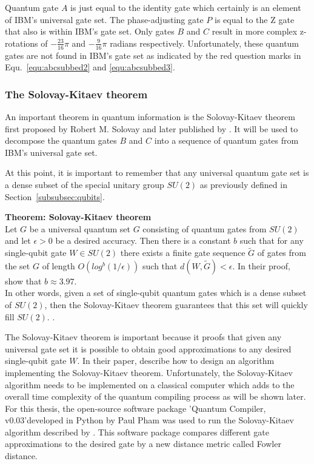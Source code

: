 Quantum gate $A$ is just equal to the identity gate which certainly is an element of IBM's universal gate set. The phase-adjusting gate $P$ is equal to the Z gate that also is within IBM's gate set. Only gates $B$ and $C$ result in more complex z-rotations of $-\frac{23}{16}\pi$ and $-\frac{9}{16}\pi$ radians respectively. Unfortunately, these quantum gates are not found in IBM's gate set as indicated by the red question marks in Equ.~\ref{equ:abcsubbed2} and \ref{equ:abcsubbed3}.

\subsubsection{The Solovay-Kitaev theorem}
\label{subsubsubsec:solovaykitaev}

An important theorem in quantum information is the Solovay-Kitaev theorem first proposed by Robert M. Solovay and later published by . It will be used to decompose the quantum gates $B$ and $C$ into a sequence of quantum gates from IBM's universal gate set.

At this point, it is important to remember that any universal quantum gate set is a dense subset of the special unitary group $SU(2)$ as previously defined in Section~\ref{subsubsec:qubits}.

\begin{redbox}
\textbf{Theorem: Solovay-Kitaev theorem}\\
\newline
Let $G$ be a universal quantum set $G$ consisting of quantum gates from $SU(2)$ and let $\epsilon > 0$ be a desired accuracy. Then there is a constant $b$ such that for any single-qubit gate $W \in SU(2)$ there exists a
finite gate sequence $\tilde{G}$ of gates from the set $G$ of length $O(log^b (1/\epsilon))$ such that $d(W, \tilde{G}) < \epsilon$. In their proof,  show that $b \approx 3.97$.\\
\newline
In other words, given a set of single-qubit quantum gates which is a dense subset of $SU(2)$, then the Solovay-Kitaev theorem guarantees that this set will quickly fill $SU(2)$.
\cite{dawson2005solovay}.
\end{redbox}

The Solovay-Kitaev theorem is important because it proofs that given any universal gate set it is possible to obtain good approximations to any desired single-qubit gate $W$. In their paper,  describe how to design an algorithm implementing the Solovay-Kitaev theorem. Unfortunately, the Solovay-Kitaev algorithm needs to be implemented on a classical computer which adds to the overall time complexity of the quantum compiling process as will be shown later. For this thesis, the open-source software package 'Quantum Compiler, v0.03'\footnotemark[15] developed in Python by Paul Pham was used to run the Solovay-Kitaev algorithm described by . This software package compares different gate approximations to the desired gate by a new distance metric called Fowler distance.

